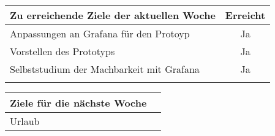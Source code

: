 \begin{tabularx}{\textwidth}{Xc}
    \arrayrulecolor{OliveGreen}
    \toprule
    {\bfseries Zu erreichende Ziele der aktuellen Woche} & {\bfseries Erreicht} \\
    \midrule[2pt]
    Anpassungen an Grafana für den Protoyp               &Ja                    \\
    \rowcolor{OliveGreen!15}
    Vorstellen des Prototyps                             &Ja                    \\
    \rowcolor{OliveGreen!15}
    Selbststudium der Machbarkeit mit Grafana            &Ja                    \\
    \rowcolor{OliveGreen!15}

   \bottomrule[2pt]
\end{tabularx}
%
\vspace{1cm}
%
\begin{tabularx}{\textwidth}{Xc}
    \arrayrulecolor{OliveGreen}
    \toprule
    {\bfseries Ziele für die nächste Woche}              &                      \\
    \midrule[2pt]
    Urlaub                                               &                      \\
\end{tabularx}

